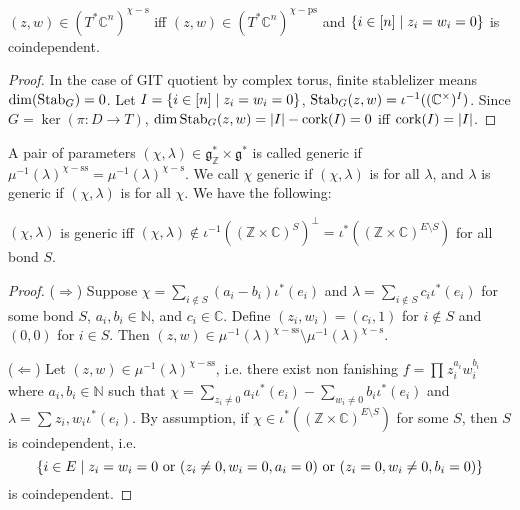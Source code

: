 \documentclass[b5paper]{article}
\newcommand{\del}{\setminus}
\newcommand{\sstab}{\mathrm{ss}}
\newcommand{\pstab}{\mathrm{ps}}
\newcommand{\stab}{\mathrm{s}}
\newcommand{\cork}{\textnormal{cork}}
\begin{document}
\begin{proposition}[pps:]{}
  $(z,w)\in (T^*\mathbb{C}^n)^{\chi-\stab}$ iff $(z,w)\in (T^*\mathbb{C}^n)^{\chi-\pstab}$ and $\left\{i\in [n]\mid z_i=w_i=0\right\}$ is coindependent.
  \begin{proof}
      In the case of GIT quotient by complex torus, finite stablelizer means $\dim(\textnormal{Stab}_G)=0$. Let $I=\left\{i\in [n] \mid z_i=w_i=0\right\}$, $\textnormal{Stab}_G(z,w)=\iota^{-1}((\mathbb{C}^\times )^I)$. Since $G=\ker(\pi:D\rightarrow T)$, $\dim\textnormal{Stab}_G(z,w)=|I|-\cork(I)=0$ iff $\cork(I)=|I|$.
  \end{proof}
\end{proposition}

A pair of parameters $(\chi,\lambda)\in \mathfrak{g}^*_{\mathbb{Z}}\times \mathfrak{g}^*$ is called generic if $\mu^{-1}(\lambda)^{\chi-\sstab}=\mu^{-1}(\lambda)^{\chi-\stab}$. We call $\chi$ generic if $(\chi,\lambda)$ is for all $\lambda$, and $\lambda$ is generic if $(\chi,\lambda)$ is for all $\chi$. We have the following:

\begin{proposition}[pps:]{}
  $(\chi,\lambda)$ is generic iff $(\chi,\lambda)\notin \iota^{-1}((\mathbb{Z}\times \mathbb{C})^S)^\perp=\iota^*((\mathbb{Z}\times \mathbb{C})^{E\del S})$ for all bond $S$.
  \begin{proof}
    ($\Rightarrow $) Suppose $\chi=\sum_{i\notin S}^{}(a_i-b_i)\iota^*(e_i)$ and $\lambda=\sum_{i\notin S}c_i\iota^*(e_i)$ for some bond $S$, $a_i,b_i\in \mathbb{N}$, and $c_i\in \mathbb{C}$. Define $(z_i,w_i)=(c_i,1)$ for $i\notin S$ and $(0,0)$ for $i\in S$. Then $(z,w)\in \mu^{-1}(\lambda)^{\chi-\sstab}\del\mu^{-1}(\lambda)^{\chi-\stab}$.

    ($\Leftarrow $) Let $(z,w)\in \mu^{-1}(\lambda)^{\chi-\sstab}$, i.e. there exist non fanishing $f=\prod_{}^{}z_i^{a_i}w_i^{b_i}$ where $a_i,b_i\in \mathbb{N}$ such that $\chi=\sum_{z_i\neq 0}^{}a_i\iota^*(e_i)-\sum_{w_i\neq 0}^{}b_i\iota^*(e_i)$ and $\lambda=\sum_{}^{}z_i,w_i\iota^*(e_i)$. By assumption, if $\chi\in \iota^*((\mathbb{Z}\times \mathbb{C})^{E\del S})$ for some $S$, then $S$ is coindependent, i.e. 
    \[
      \left\{i\in E\mid z_i=w_i=0\textnormal{ or }(z_i\neq 0,w_i=0,a_i=0)\textnormal{ or }(z_i=0,w_i\neq 0,b_i=0)\right\}
    \]
    is coindependent.
  \end{proof}
\end{proposition}
\end{document}
